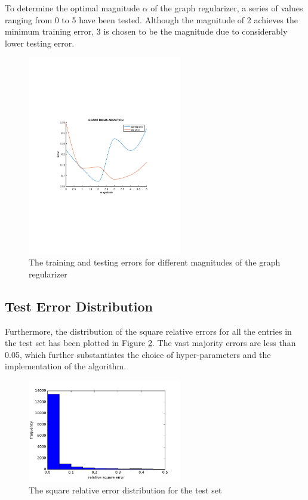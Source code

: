 \documentclass[a4paper]{article}
\begin{document}
To determine the optimal magnitude $\alpha$ of the graph regularizer, a series of values ranging from 0 to 5 have been tested. Although the magnitude of 2 achieves the minimum training error, 3 is chosen to be the magnitude due to considerably lower testing error.
\begin{figure}
\centering
\includegraphics[width=0.6\textwidth]{GRAPH_REGULARIZATION.pdf}
\caption{\label{fig:graph}The training and testing errors for different magnitudes of the graph regularizer}
\end{figure}
\subsection{Test Error Distribution}
Furthermore, the distribution of the square relative errors for all the entries in the test set has been plotted in Figure \ref{fig:hist}. The vast majority errors are less than 0.05, which further substantiates the choice of hyper-parameters and the implementation of the algorithm. 
\begin{figure}
\centering
\includegraphics[width=0.6\textwidth]{hist.pdf}
\caption{\label{fig:hist}The square relative error distribution for the test set}
\end{figure}
\end{document}
